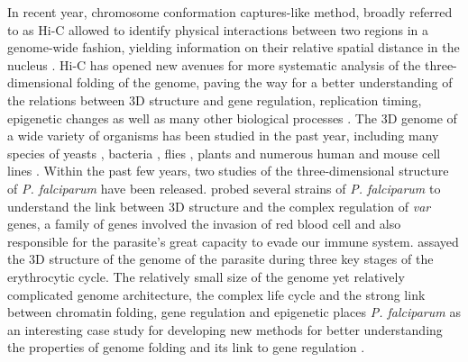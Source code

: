 \documentclass[2columns]{article}
\begin{document}
In recent year, chromosome conformation captures-like method, broadly referred
to as Hi-C allowed to identify physical interactions between two regions in a
genome-wide fashion, yielding information on their relative spatial distance
in the nucleus \citep{lieberman-aiden:comprehensive}. 
Hi-C has opened new avenues for more systematic analysis of
the three-dimensional folding of the genome, paving the way for a better
understanding of the relations between 3D structure and gene regulation,
replication timing, epigenetic changes as well as many other biological
processes \citep{de:dna, dixon:topological, rao:3d}. 
The 3D genome of a wide variety of organisms has been studied in
the past year, including many species of yeasts \citep{duan:three-dimensional,
burton:species-level, mizuguchi:cohesin-dependent}, bacteria
\citep{umbarger:three-dimensional}, flies \citep{sexton:three-dimensional},
plants \citep{feng:genome-wide, wang:genome-wide} and numerous human and mouse
cell lines \citep{lieberman-aiden:comprehensive, rao:3d, dixon:topological}. Within the past few
years, two studies of the three-dimensional structure of {\em P. falciparum}
have been released.  \citet{lemieux:genome-wide} probed several strains of
{\em P. falciparum} to understand the link between 3D structure and the
complex regulation of \textit{var} genes, a family of genes involved the
invasion of red blood cell and also responsible for the parasite's great
capacity to evade our immune system. \citet{ay:three-dimensional} assayed the
3D structure of the genome of the parasite during three key stages of the
erythrocytic cycle. The relatively small size of the genome yet relatively
complicated genome architecture, the complex life cycle and the strong link
between chromatin folding, gene regulation and epigenetic places {\em P.
falciparum} as an interesting case study for developing new methods for better
understanding the properties of genome folding and its link to gene
regulation \citep{ay:three-dimensional, lemieux:genome-wide, ay:multiple}.
\end{document}
